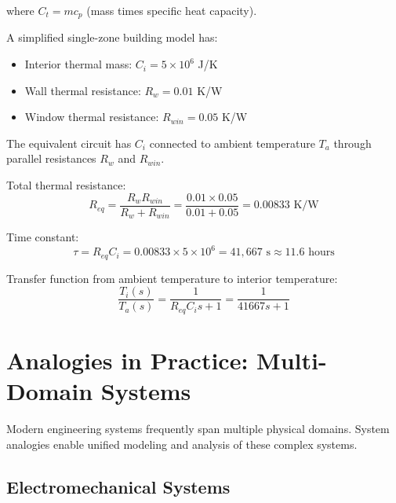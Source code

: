 where $C_t = mc_p$ (mass times specific heat capacity).

\begin{examplebox}[title=Example 5.4: Building Thermal Model]
A simplified single-zone building model has:
\begin{itemize}
    \item Interior thermal mass: $C_i = 5 \times 10^6$ J/K
    \item Wall thermal resistance: $R_w = 0.01$ K/W
    \item Window thermal resistance: $R_{win} = 0.05$ K/W
\end{itemize}

The equivalent circuit has $C_i$ connected to ambient temperature $T_a$ through parallel resistances $R_w$ and $R_{win}$.

Total thermal resistance:
\begin{equation}
R_{eq} = \frac{R_w R_{win}}{R_w + R_{win}} = \frac{0.01 \times 0.05}{0.01 + 0.05} = 0.00833 \text{ K/W}
\end{equation}

Time constant:
\begin{equation}
\tau = R_{eq} C_i = 0.00833 \times 5 \times 10^6 = 41{,}667 \text{ s} \approx 11.6 \text{ hours}
\end{equation}

Transfer function from ambient temperature to interior temperature:
\begin{equation}
\frac{T_i(s)}{T_a(s)} = \frac{1}{R_{eq}C_i s + 1} = \frac{1}{41667s + 1}
\end{equation}
\end{examplebox}

\section{Analogies in Practice: Multi-Domain Systems}
\label{sec:practice}

Modern engineering systems frequently span multiple physical domains. System analogies enable unified modeling and analysis of these complex systems.

\subsection{Electromechanical Systems}

